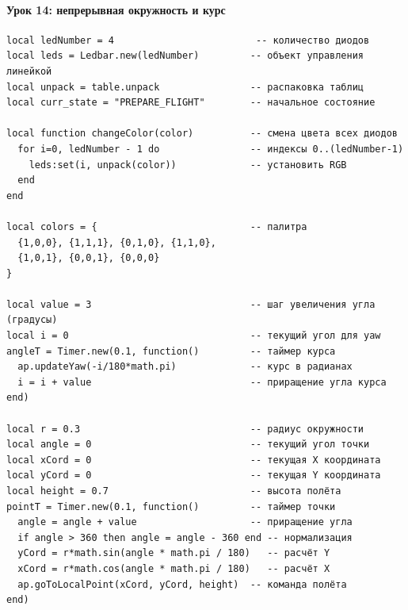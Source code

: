 \paragraph{Урок 14: непрерывная окружность и курс}
\begin{verbatim}
local ledNumber = 4                         -- количество диодов
local leds = Ledbar.new(ledNumber)         -- объект управления линейкой
local unpack = table.unpack                -- распаковка таблиц
local curr_state = "PREPARE_FLIGHT"        -- начальное состояние

local function changeColor(color)          -- смена цвета всех диодов
  for i=0, ledNumber - 1 do                -- индексы 0..(ledNumber-1)
    leds:set(i, unpack(color))             -- установить RGB
  end
end

local colors = {                           -- палитра
  {1,0,0}, {1,1,1}, {0,1,0}, {1,1,0},
  {1,0,1}, {0,0,1}, {0,0,0}
}

local value = 3                            -- шаг увеличения угла (градусы)
local i = 0                                -- текущий угол для yaw
angleT = Timer.new(0.1, function()         -- таймер курса
  ap.updateYaw(-i/180*math.pi)             -- курс в радианах
  i = i + value                            -- приращение угла курса
end)

local r = 0.3                              -- радиус окружности
local angle = 0                            -- текущий угол точки
local xCord = 0                            -- текущая X координата
local yCord = 0                            -- текущая Y координата
local height = 0.7                         -- высота полёта
pointT = Timer.new(0.1, function()         -- таймер точки
  angle = angle + value                    -- приращение угла
  if angle > 360 then angle = angle - 360 end -- нормализация
  yCord = r*math.sin(angle * math.pi / 180)   -- расчёт Y
  xCord = r*math.cos(angle * math.pi / 180)   -- расчёт X
  ap.goToLocalPoint(xCord, yCord, height)  -- команда полёта
end)


\end{verbatim}
